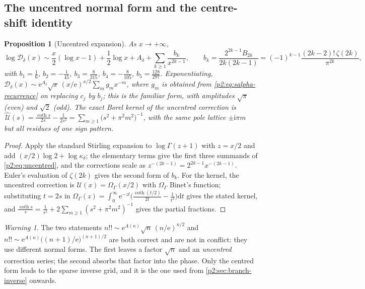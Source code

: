 \documentclass[11pt,a4paper,oneside]{book}
\theoremstyle{plain}
\newtheorem{proposition}[theorem]{Proposition}
\theoremstyle{definition}
\theoremstyle{remark}
\newtheorem{warning}[theorem]{Warning}
\newcommand{\e}{\mathrm{e}}
\newcommand{\ii}{\mathrm{i}}
\newcommand{\dd}{\mathrm{d}}
\begin{document}
\subsection{The uncentred normal form and the centre-shift identity}

\begin{proposition}[Uncentred expansion]
\label{p2:prop:uncentred}
As \(x\to+\infty\),
\begin{equation}
 \log\mathcal D_\delta(x)
 \sim\frac x2(\log x-1)+\frac12\log x+A_\delta
 +\sum_{k\ge1}\frac{b_k}{x^{2k-1}},
 \qquad
 b_k=\frac{2^{2k-1}B_{2k}}{2k(2k-1)}
   =(-1)^{k-1}\frac{(2k-2)!\,\zeta(2k)}{\pi^{2k}} ,
 \label{p2:eq:uncentred}
\end{equation}
with \(b_1=\tfrac16\), \(b_2=-\tfrac1{45}\), \(b_3=\tfrac8{315}\),
\(b_4=-\tfrac8{105}\), \(b_5=\tfrac{128}{297}\).  Exponentiating,
\(\mathcal D_\delta(x)\sim\e^{A_\delta}\sqrt x\,(x/\e)^{x/2}\sum_m g_mx^{-m}\),
where \(g_m\) is obtained from \cref{p2:eq:salpha-recurrence} on replacing
\(c_j\) by \(b_j\); this is the familiar form, with amplitudes \(\sqrt\pi\)
(even) and \(\sqrt2\) (odd).  The exact Borel kernel of the uncentred
correction is
\(\widehat{\,\mathcal U}(s)=\tfrac{\coth s}{2s}-\tfrac1{2s^2}
=\sum_{m\ge1}\bigl(s^2+\pi^2m^2\bigr)^{-1}\), with the \emph{same} pole
lattice \(\pm\ii\pi m\) but all residues of one sign pattern.
\end{proposition}

\begin{proof}
Apply the standard Stirling expansion to \(\log\Gamma(z+1)\) with
\(z=x/2\) and add \((x/2)\log2+\log\kappa_\delta\); the elementary terms give
the first three summands of \cref{p2:eq:uncentred}, and the corrections scale
as \(z^{-(2k-1)}=2^{2k-1}x^{-(2k-1)}\).  Euler's evaluation of \(\zeta(2k)\)
gives the second form of \(b_k\).  For the kernel, the uncentred correction is
\(\mathcal U(x)=\Omega_\Gamma(x/2)\) with \(\Omega_\Gamma\) Binet's function;
substituting \(t=2s\) in
\(\Omega_\Gamma(z)=\int_0^\infty\e^{-zt}
\bigl(\tfrac{\coth(t/2)}{2t}-\tfrac1{t^2}\bigr)\dd t\) gives the stated kernel,
and \(\tfrac{\coth s}s=\tfrac1{s^2}+2\sum_{m\ge1}(s^2+\pi^2m^2)^{-1}\) gives
the partial fractions.
\end{proof}

\begin{warning}
\label{p2:rem:two-normal-forms}
The two statements
\(n!!\sim \e^{A(n)}\sqrt n\,(n/\e)^{n/2}\) and
\(n!!\sim \e^{A(n)}\bigl((n+1)/\e\bigr)^{(n+1)/2}\)
are both correct and are not in conflict: they use different normal forms.  The
first leaves a factor \(\sqrt n\) and an \emph{uncentred} correction series;
the second absorbs that factor into the phase.  Only the centred form leads to
the sparse inverse grid, and it is the one used from
\cref{p2:sec:branch-inverse} onwards.
\end{warning}
\end{document}
